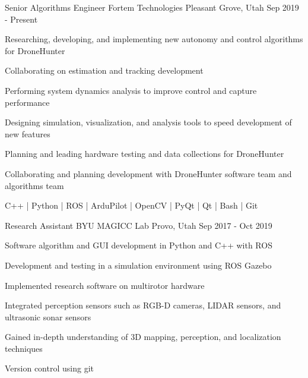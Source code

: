 
\begin{cventries}

\cventry
  {Senior Algorithms Engineer}
  {Fortem Technologies}
  {Pleasant Grove, Utah}
  {Sep 2019 - Present}
  {
    \begin{cvitems}
      \item{Researching, developing, and implementing new autonomy and control algorithms for DroneHunter}
      \item{Collaborating on estimation and tracking development}
      \item{Performing system dynamics analysis to improve control and capture performance}
      \item{Designing simulation, visualization, and analysis tools to speed development of new features}
      \item{Planning and leading hardware testing and data collections for DroneHunter}
      \item{Collaborating and planning development with DroneHunter software team and algorithms team}
      \item{C++ | Python | ROS | ArduPilot | OpenCV | PyQt | Qt | Bash | Git}
    \end{cvitems}
  }

\cventry
  {Research Assistant} %
  {BYU MAGICC Lab} %
  {Provo, Utah} %
  {Sep 2017 - Oct 2019} %
  {
    \begin{cvitems} %
      \item{Software algorithm and GUI development in Python and C++ with ROS}
      \item{Development and testing in a simulation environment using ROS Gazebo}
      \item{Implemented research software on multirotor hardware}
      \item{Integrated perception sensors such as RGB-D cameras, LIDAR sensors, and ultrasonic sonar sensors}
      \item{Gained in-depth understanding of 3D mapping, perception, and localization techniques}
      \item{Version control using git}
    \end{cvitems}
  }


\end{cventries}
